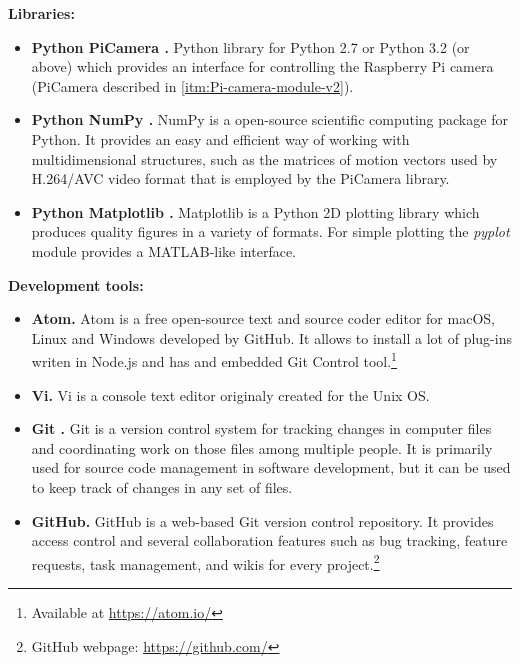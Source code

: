 \textbf{Libraries:}
\begin{itemize}
	\item \textbf{Python PiCamera \cite{PiCameraDoc}.} Python library for Python 2.7 or Python 3.2 (or above) which provides an interface for controlling the Raspberry Pi camera (PiCamera described in \ref{itm:Pi-camera-module-v2}).
	
	\item \textbf{Python NumPy \cite{NumPy}.} NumPy is a open-source scientific computing package for Python. It provides an easy and efficient way of working with multidimensional structures, such as the matrices of motion vectors used by H.264/AVC video format that is employed by the PiCamera library.
	
	\item \textbf{Python Matplotlib \cite{Hun07}.} Matplotlib is a Python 2D plotting library which produces quality figures in a variety of formats. For simple plotting the \emph{pyplot} module provides a MATLAB-like interface.
	
\end{itemize}

\textbf{Development tools:}
\begin{itemize}
	\item \textbf{Atom.} Atom is a free open-source text and source coder editor for macOS, Linux and Windows developed by GitHub. It allows to install a lot of plug-ins writen in Node.js and has and embedded Git Control tool.\footnote{Available at \url{https://atom.io/}}
	
	\item \textbf{Vi.} Vi is a console text editor originaly created for the Unix \ac{OS}. 
	
	\item \textbf{Git \cite{CS14}.} Git is a version control system for tracking changes in computer files and coordinating work on those files among multiple people. It is primarily used for source code management in software development, but it can be used to keep track of changes in any set of files.
	
	\item \textbf{GitHub.} GitHub is a web-based Git version control repository. It provides access control and several collaboration features such as bug tracking, feature requests, task management, and wikis for every project.\footnote{GitHub webpage: \url{https://github.com/}}
	
	
	
\end{itemize}

